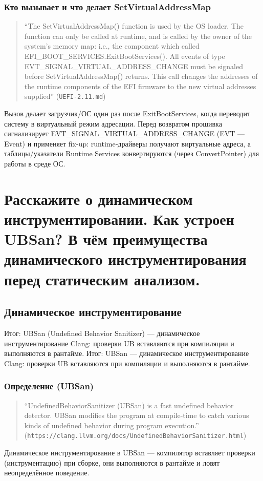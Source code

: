 \documentclass[a4paper,12pt]{article}
\begin{document}
\subsubsection{Кто вызывает и что делает SetVirtualAddressMap}
\begin{quote}
``The SetVirtualAddressMap() function is used by the OS loader. The function can only be called at runtime, and is called by the owner of the system’s memory map: i.e., the component which called EFI\_BOOT\_SERVICES.ExitBootServices(). All events of type EVT\_SIGNAL\_VIRTUAL\_ADDRESS\_CHANGE must be signaled before SetVirtualAddressMap() returns. This call changes the addresses of the runtime components of the EFI firmware to the new virtual addresses supplied'' (\texttt{UEFI-2.11.md})
\end{quote}
Вызов делает загрузчик/ОС один раз после ExitBootServices, когда переводит систему в виртуальный режим адресации. Перед возвратом прошивка сигнализирует EVT\_SIGNAL\_VIRTUAL\_ADDRESS\_CHANGE (EVT — Event) и применяет fix-up: runtime‑драйверы получают виртуальные адреса, а таблицы/указатели Runtime Services конвертируются (через ConvertPointer) для работы в среде ОС.

\section{Расскажите о динамическом инструментировании. Как устроен UBSan? В чём преимущества динамического инструментирования перед статическим анализом.}
\subsection{Динамическое инструментирование}
Итог: UBSan (Undefined Behavior Sanitizer) — динамическое инструментирование Clang: проверки UB вставляются при компиляции и выполняются в рантайме.
Итог: UBSan — динамическое инструментирование Clang: проверки UB вставляются при компиляции и выполняются в рантайме.
\subsubsection{Определение (UBSan)}
\begin{quote}
``UndefinedBehaviorSanitizer (UBSan) is a fast undefined behavior detector. UBSan modifies the program at compile-time to catch various kinds of undefined behavior during program execution.'' (\texttt{https://clang.llvm.org/docs/UndefinedBehaviorSanitizer.html})
\end{quote}
Динамическое инструментирование в UBSan — компилятор вставляет проверки (инструментацию) при сборке, они выполняются в рантайме и ловят неопределённое поведение.
\end{document}
